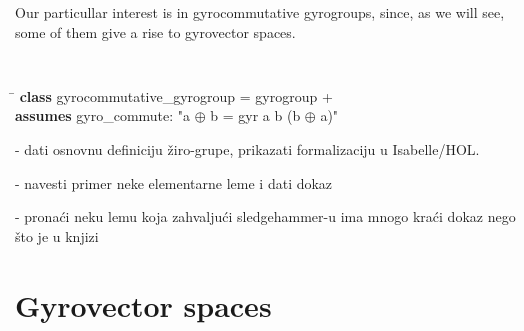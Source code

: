 \documentclass[a4paper]{article}
\theoremstyle{definition}
\begin{document}
Our particullar interest is in gyrocommutative gyrogroups, since, as we will see, some of them give a rise to gyrovector spaces.


\begin{small}
{\tt
\begin{tabbing}
\hspace{5mm}\=\kill
{\bf class} gyrocommutative\_gyrogroup = gyrogroup + \\
\> {\bf assumes}  gyro\_commute: "a $\oplus$ b = gyr a b (b $\oplus$ a)"
\end{tabbing}
}
\end{small}

- dati osnovnu definiciju žiro-grupe, prikazati formalizaciju u Isabelle/HOL.

- navesti primer neke elementarne leme i dati dokaz

- pronaći neku lemu koja zahvaljući sledgehammer-u ima mnogo kraći dokaz nego što je u knjizi 

\section{Gyrovector spaces}\label{sec:gyrovectorspaces}
\end{document}
